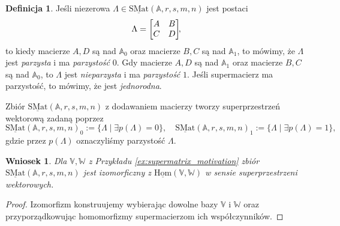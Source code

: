 \documentclass[11pt,a4paper]{report}
\newtheorem{corollary}[theorem]{Wniosek}
\theoremstyle{definition}
\newtheorem{definition}[theorem]{Definicja}
\begin{document}
\begin{definition}
	\label{supermatrix_components_dimension}
	Jeśli niezerowa $\Lambda \in \underline{\mathrm{SMat}}(\mathbb{A},r,s,m,n)$ jest postaci
	\begin{equation}
		\newline \Lambda=\begin{bmatrix}
		A & B \\
		C & D
		\end{bmatrix}\!\!,
	\end{equation}
	to kiedy macierze $A,D$ są nad $\mathbb{A}_0$ oraz macierze $B,C$ są nad $\mathbb{A}_1$, to mówimy, że $\Lambda$ jest \textit{parzysta} i ma \textit{parzystość} $0$. Gdy macierze $A,D$ są nad $\mathbb{A}_1$ oraz macierze $B,C$ są nad $\mathbb{A}_0$, to $\Lambda$ jest \textit{nieparzysta} i ma \textit{parzystość} $1$. Jeśli supermacierz ma parzystość, to mówimy, że jest \textit{jednorodna}.
\end{definition}

Zbiór $\underline{\mathrm{SMat}}(\mathbb{A},r,s,m,n)$ z dodawaniem macierzy tworzy superprzestrzeń wektorową zadaną poprzez
\begin{equation*}
	\underline{\mathrm{SMat}}(\mathbb{A},r,s,m,n)_0 := \{ \Lambda \mid \exists p(\Lambda)=0 \}, \quad \underline{\mathrm{SMat}}(\mathbb{A},r,s,m,n)_1 := \{ \Lambda \mid \exists p(\Lambda) = 1\},
\end{equation*}
gdzie przez $p(\Lambda)$ oznaczyliśmy parzystość $\Lambda$.

\begin{corollary}
	Dla $\mathbb{V}, \mathbb{W}$ z Przykładu \ref{ex:supermatrix_motivation} zbiór $\underline{\mathrm{SMat}}(\mathbb{A},r,s,m,n)$ jest izomorficzny z $\underline{\mathrm{Hom}}(\mathbb{V},\mathbb{W})$ w sensie superprzestrzeni wektorowych.
\end{corollary}

\begin{proof}
	Izomorfizm konstruujemy wybierając dowolne bazy $\mathbb{V}$ i $\mathbb{W}$ oraz przyporządkowując homomorfizmy supermacierzom ich współczynników.
\end{proof}
\end{document}
